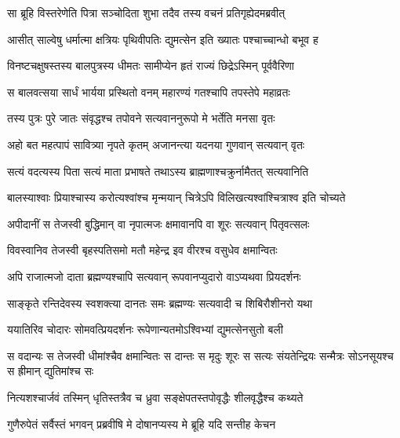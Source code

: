 \begin{center}
\twolineshloka
{सा ब्रूहि विस्तरेणेति पित्रा सञ्चोदिता शुभा}
{तदैव तस्य वचनं प्रतिगृह्येदमब्रवीत्}

\twolineshloka
{आसीत् साल्वेषु धर्मात्मा क्षत्रियः पृथिवीपतिः}
{द्युमत्सेन इति ख्यातः पश्चाच्चान्धो बभूव ह}

\twolineshloka
{विनष्टचक्षुषस्तस्य बालपुत्रस्य धीमतः}
{सामीप्येन हृतं राज्यं छिद्रेऽस्मिन् पूर्ववैरिणा}

\twolineshloka
{स बालवत्सया सार्धं भार्यया प्रस्थितो वनम्}
{महारण्यं गतश्चापि तपस्तेपे महाव्रतः}

\twolineshloka
{तस्य पुत्रः पुरे जातः संवृद्धश्च तपोवने}
{सत्यवाननुरूपो मे भर्तेति मनसा वृतः}


\twolineshloka
{अहो बत महत्पापं सावित्र्या नृपते कृतम्}
{अजानन्त्या यदनया गुणवान् सत्यवान् वृतः}

\twolineshloka
{सत्यं वदत्यस्य पिता सत्यं माता प्रभाषते}
{तथाऽस्य ब्राह्मणाश्चक्रुर्नामैतत् सत्यवानिति}

\twolineshloka
{बालस्याश्वाः प्रियाश्चास्य करोत्यश्वांश्च मृन्मयान्}
{चित्रेऽपि विलिखत्यश्वांश्चित्राश्व इति चोच्यते}


\twolineshloka
{अपीदानीं स तेजस्वी बुद्धिमान् वा नृपात्मजः}
{क्षमावानपि वा शूरः सत्यवान् पितृवत्सलः}


\twolineshloka
{विवस्वानिव तेजस्वी बृहस्पतिसमो मतौ}
{महेन्द्र इव वीरश्च वसुधेव क्षमान्वितः}


\twolineshloka
{अपि राजात्मजो दाता ब्रह्मण्यश्चापि सत्यवान्}
{रूपवानप्युदारो वाऽप्यथवा प्रियदर्शनः}


\twolineshloka
{साङ्कृते रन्तिदेवस्य स्वशक्त्या दानतः समः}
{ब्रह्मण्यः सत्यवादी च शिबिरौशीनरो यथा}

\twolineshloka
{ययातिरिव चोदारः सोमवत्प्रियदर्शनः}
{रूपेणान्यतमोऽश्विभ्यां द्युमत्सेनसुतो बली}

\threelineshloka
{स वदान्यः स तेजस्वी धीमांश्चैव क्षमान्वितः}
{स दान्तः स मृदुः शूरः स सत्यः संयतेन्द्रियः}
{सन्मैत्रः सोऽनसूयश्च स ह्रीमान् द्युतिमांश्च सः}

\twolineshloka
{नित्यशश्चार्जवं तस्मिन् धृतिस्तत्रैव च ध्रुवा}
{सङ्क्षेपतस्तपोवृद्धैः शीलवृद्धैश्च कथ्यते}


\twolineshloka
{गुणैरुपेतं सर्वैस्तं भगवन् प्रब्रवीषि मे}
{दोषानप्यस्य मे ब्रूहि यदि सन्तीह केचन}


\end{center}
